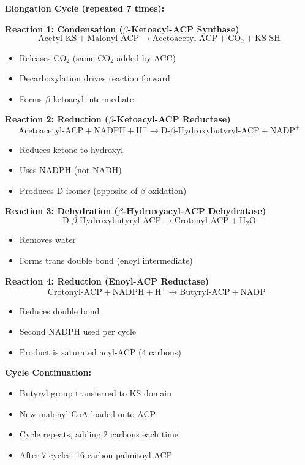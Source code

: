\textbf{Elongation Cycle (repeated 7 times):}

\textbf{Reaction 1: Condensation ($\beta$-Ketoacyl-ACP Synthase)}
\[
\text{Acetyl-KS} + \text{Malonyl-ACP} \rightarrow \text{Acetoacetyl-ACP} + \text{CO}_2 + \text{KS-SH}
\]
\begin{itemize}
    \item Releases CO$_2$ (same CO$_2$ added by ACC)
    \item Decarboxylation drives reaction forward
    \item Forms $\beta$-ketoacyl intermediate
\end{itemize}

\textbf{Reaction 2: Reduction ($\beta$-Ketoacyl-ACP Reductase)}
\[
\text{Acetoacetyl-ACP} + \text{NADPH} + \text{H}^+ \rightarrow \text{D-$\beta$-Hydroxybutyryl-ACP} + \text{NADP}^+
\]
\begin{itemize}
    \item Reduces ketone to hydroxyl
    \item Uses NADPH (not NADH)
    \item Produces D-isomer (opposite of $\beta$-oxidation)
\end{itemize}

\textbf{Reaction 3: Dehydration ($\beta$-Hydroxyacyl-ACP Dehydratase)}
\[
\text{D-$\beta$-Hydroxybutyryl-ACP} \rightarrow \text{Crotonyl-ACP} + \text{H}_2\text{O}
\]
\begin{itemize}
    \item Removes water
    \item Forms trans double bond (enoyl intermediate)
\end{itemize}

\textbf{Reaction 4: Reduction (Enoyl-ACP Reductase)}
\[
\text{Crotonyl-ACP} + \text{NADPH} + \text{H}^+ \rightarrow \text{Butyryl-ACP} + \text{NADP}^+
\]
\begin{itemize}
    \item Reduces double bond
    \item Second NADPH used per cycle
    \item Product is saturated acyl-ACP (4 carbons)
\end{itemize}

\textbf{Cycle Continuation:}
\begin{itemize}
    \item Butyryl group transferred to KS domain
    \item New malonyl-CoA loaded onto ACP
    \item Cycle repeats, adding 2 carbons each time
    \item After 7 cycles: 16-carbon palmitoyl-ACP
\end{itemize}

